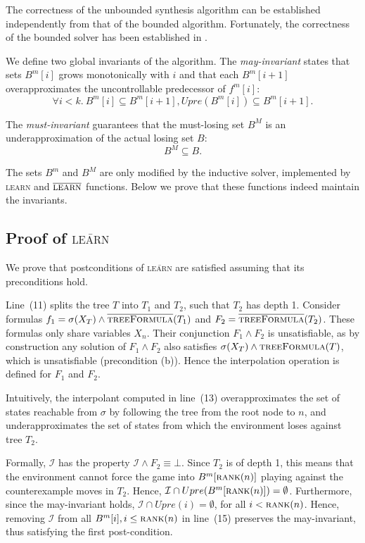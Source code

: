 \documentclass{llncs}
\newcommand{\II}{\mathcal{I}}
\newcommand{\textoverline}[1]{$\overline{\mbox{#1}}$}
\begin{document}
The correctness of the unbounded synthesis algorithm can be established
independently from that of the bounded algorithm. Fortunately, the correctness
of the bounded solver has been established in \cite{narodytska2014}.

We define two global invariants of the algorithm.  The \emph{may-invariant}
states that sets $B^m[i]$ grows monotonically with $i$ and that each $B^m[i+1]$
overapproximates the uncontrollable predecessor of $f^m[i]$: $$\forall
i<k.~B^m[i] \subseteq B^m[i+1], Upre(B^m[i]) \subseteq B^m[i+1].$$

The \emph{must-invariant} guarantees that the must-losing set $B^M$ is an
underapproximation of the actual losing set $B$: $$B^M \subseteq B.$$

The sets $B^m$ and $B^M$ are only modified by the inductive solver, implemented
by \textsc{learn} and \textoverline{\textsc{learn}} functions.  Below we prove that these
functions indeed maintain the invariants.

\subsection{Proof of \textsc{\textoverline{learn}}}

We prove that postconditions of \textsc{\textoverline{learn}} are satisfied
assuming that its preconditions hold.

Line~(11) splits the tree $T$ into $T_1$ and $T_2$, such that $T_2$ has depth
1.  Consider formulas $f_1=\sigma(X_T) \land
\textsc{\textoverline{treeFormula}}(T_1)$ and $F_2 =
\textsc{\textoverline{treeFormula}}(T_2)$.  These formulas only share variables
$X_n$.  Their conjunction $F_1 \land F_2$ is unsatisfiable, as by construction
any solution of $F_1 \land F_2$ also satisfies $\sigma(X_T) \land
\textsc{treeFormula}(T)$, which is unsatisfiable (precondition (b)).  Hence the
interpolation operation is defined for $F_1$ and $F_2$.  

Intuitively, the interpolant computed in line~(13) overapproximates the set of
states reachable from $\sigma$ by following the tree from the root node to $n$,
and underapproximates the set of states from which the environment loses
against tree $T_2$.  

Formally, $\II$ has the property $\II \land F_2 \equiv \bot$.  Since $T_2$ is
of depth 1, this means that the environment cannot force the game into
$B^m[\textsc{rank}(n)]$ playing against the counterexample moves in $T_2$.
Hence, $\II \cap Upre(B^m[\textsc{rank}(n)]) = \emptyset$.  Furthermore, since
the may-invariant holds, $\II \cap Upre(i) = \emptyset$, for all $i <
\textsc{rank}(n)$.  Hence, removing $\II$ from all $B^m[i], i\leq
\textsc{rank}(n)$ in line~(15) preserves the may-invariant, thus satisfying the
first post-condition.
\end{document}
